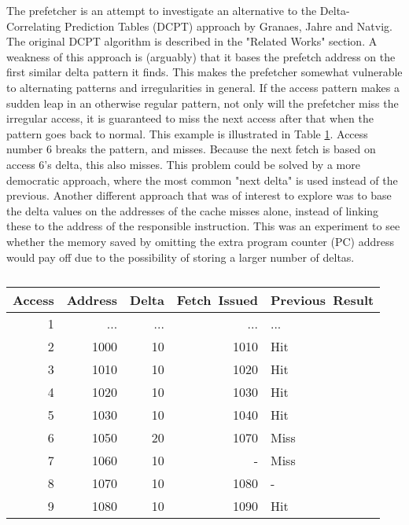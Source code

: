 

The prefetcher is an attempt to investigate an alternative to the Delta-Correlating Prediction Tables (DCPT) approach by Granaes, Jahre and Natvig. The original DCPT algorithm is described in the "Related Works" section. A weakness of this approach is (arguably) that it bases the prefetch address on the first similar delta pattern it finds. This makes the prefetcher somewhat vulnerable to alternating patterns and irregularities in general. If the access pattern makes a sudden leap in an otherwise regular pattern, not only will the prefetcher miss the irregular access, it is guaranteed to miss the next access after that when the pattern goes back to normal. This example is illustrated in Table \ref{table:breakDCPT}. Access number 6 breaks the pattern, and misses. Because the next fetch is based on access 6's delta, this also misses. This problem could be solved by a more democratic approach, where the most common "next delta" is used instead of the previous. 
Another different approach that was of interest to explore was to base the delta values on the addresses of the cache misses alone, instead of linking these to the address of the responsible instruction. This was an experiment to see whether the memory saved by omitting the extra program counter (PC) address would pay off due to the possibility of storing a larger number of deltas.
\begin{table}[!t]
\renewcommand{\arraystretch}{1.3}
\caption{}
\label{table:breakDCPT}
\centering
\begin{tabular}{|r|r|r|r|l|}
\hline
\bfseries Access & \bfseries Address & \bfseries Delta & \bfseries Fetch~Issued & \bfseries Previous~Result\\
\hline
\hline
1 & ... & ... & ... & ...\\
2 & 1000 & 10 & 1010 & Hit\\
3 & 1010 & 10 & 1020 & Hit\\
4 & 1020 & 10 & 1030 & Hit\\
5 & 1030 & 10 & 1040 & Hit\\
6 & 1050 & 20 & 1070 & Miss\\
7 & 1060 & 10 & - 	 & Miss\\
8 & 1070 & 10 & 1080 & -\\
9 & 1080 & 10 & 1090 & Hit\\
\hline
\end{tabular}
\end{table}

